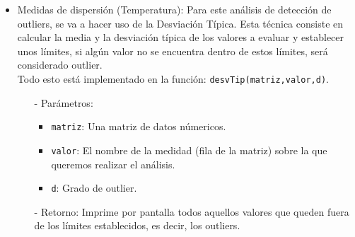 \documentclass[a4paper, 12pt]{article}
\begin{document}
{\begin{itemize}
\begin{itemize}
				\item[-] Retorno: Imprime por pantalla todos aquellos valores que queden fuera de los límites establecidos, es decir, los outliers.
				
				\item[-] Explicación: Esta función calcula los outliers sobre una serie de valores. Recibe el grado de outlier (\texttt{d}) y una matriz (\texttt{matriz}) con dichos valores y lo primero que hace es crear un dataframe de la traspuesta de dicha matriz, para facilitar su tratamiento. Después a partir de \texttt{valor}, obtiene la fila de la matriz que contiene los valores que vamos a evaluar. Una vez hecho esto hace uso de la función \texttt{quantiler()}, la cual hemos implementado previamente, para calcular el primer y tercer cuartil, \texttt{$Q_{1}$} y \texttt{$Q_{3}$} respectivamente . Por último calcula los límites a partir de, \texttt{$(Q_{1} - d \cdot (Q_{3} - Q_{1}), Q_{3} + d \cdot (Q_{3} - Q_{1}))$} e imprimirá por pantalla todos aquellos valores que se encuentren fuera de estos límites establecidos, ya que, serán considerados outliers.
			\end{itemize}
			
			\item Medidas de dispersión (Temperatura): Para este análisis de detección de outliers, se va a hacer uso de la Desviación Típica. Esta técnica consiste en calcular la media y la desviación típica de los valores a evaluar y establecer unos límites, si algún valor no se encuentra dentro de estos límites, será considerado outlier. \\
			Todo esto está implementado en la función: \texttt{desvTip(matriz,valor,d)}.
			\begin{itemize}
				\item[-] Parámetros:
				\begin{itemize}
					\item \texttt{matriz}: Una matriz de datos númericos.
					\item \texttt{valor}: El nombre de la medidad (fila de la matriz) sobre la que queremos realizar el análisis.
					\item \texttt{d}: Grado de outlier.
				\end{itemize}
				
				\item[-] Retorno: Imprime por pantalla todos aquellos valores que queden fuera de los límites establecidos, es decir, los outliers.
				

\end{itemize}
\end{itemize}}
\end{document}
